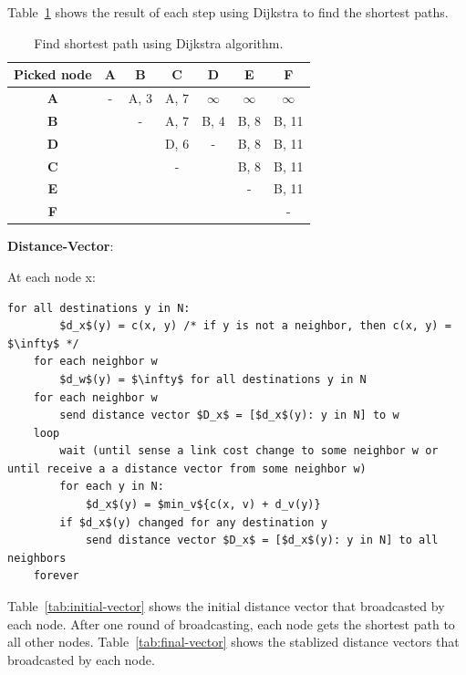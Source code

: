 \documentclass{article}
\begin{document}
Table~\ref{tab:dijkstra} shows the result of each step using Dijkstra to find the shortest paths.
\begin{table}[h!]
    \begin{center}
      \caption{Find shortest path using Dijkstra algorithm.}
      \label{tab:dijkstra}
      \begin{tabular}{c|c|c|c|c|c|c} %
        \toprule
        \textbf{Picked node}& \textbf{A}&\textbf{B}&\textbf{C}&\textbf{D}&\textbf{E}&\textbf{F}\\
        \hline
        \textbf{A}&-&A, 3&A, 7&$\infty$&$\infty$&$\infty$\\
        \hline
        \textbf{B}&&-&A, 7&B, 4&B, 8&B, 11\\
        \hline
        \textbf{D}&&&D, 6&-&B, 8&B, 11\\
        \hline
        \textbf{C}&&&-&&B, 8&B, 11\\
        \hline
        \textbf{E}&&&&&-&B, 11\\
        \hline
        \textbf{F}&&&&&&-\\
        \bottomrule
      \end{tabular}
    \end{center}
  \end{table}

\textbf{Distance-Vector}:

At each node x:
\begin{lstlisting}[mathescape=true]
    for all destinations y in N:
        $d_x$(y) = c(x, y) /* if y is not a neighbor, then c(x, y) = $\infty$ */
    for each neighbor w
        $d_w$(y) = $\infty$ for all destinations y in N
    for each neighbor w
        send distance vector $D_x$ = [$d_x$(y): y in N] to w
    loop
        wait (until sense a link cost change to some neighbor w or until receive a a distance vector from some neighbor w)
        for each y in N:
            $d_x$(y) = $min_v${c(x, v) + d_v(y)}
        if $d_x$(y) changed for any destination y
            send distance vector $D_x$ = [$d_x$(y): y in N] to all neighbors
    forever
\end{lstlisting}

Table~\ref{tab:initial-vector} shows the initial distance vector that broadcasted by each node. After one round of broadcasting, each node gets the shortest path to all other nodes. Table~\ref{tab:final-vector} shows the stablized distance vectors that broadcasted by each node.
\end{document}
